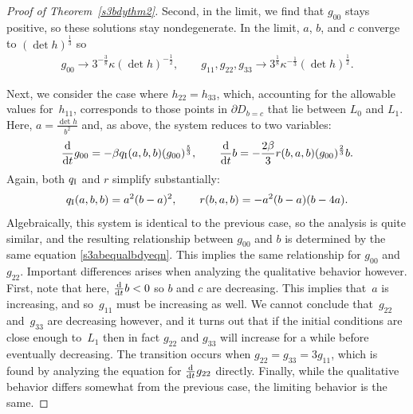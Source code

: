 \documentclass[pdftex]{sigma}
\numberwithin{equation}{section}
\newcommand{\dtime}{\frac{{\rm d}}{{\rm d} t}} %
\begin{document}
\begin{proof}[Proof of Theorem~\ref{s3bdythm2}]
Second, in the limit, we find that $g_{00}$ stays positive, so these solutions stay nondegenerate. In the limit, $a$, $b$, and $c$ converge to $(\det h)^{\frac{1}{3}}$ so
\begin{gather*}
g_{00} \rightarrow 3^{-\frac{3}{8}} \kappa (\det h)^{-\frac{1}{2}},\qquad
g_{11}, g_{22}, g_{33} \rightarrow 3^{\frac{1}{8}} \kappa^{-\frac{1}{3}} (\det h)^{\frac{1}{2}}.
\end{gather*}

Next, we consider the case where $h_{22} = h_{33}$, which, accounting for the allowable values for~$h_{11}$, corresponds to those points in $\partial D_{b = c}$ that lie between $L_0$ and $L_1$. Here, $a = \frac{\det h}{b^2}$ and, as above, the system reduces to two variables:
\begin{gather*}
\dtime g_{00} = - \beta q_{\rm I}(a, b, b) (g_{00})^{\frac{5}{3}},\qquad
\dtime b = - \frac{2 \beta}{3} r(b, a, b) (g_{00})^{\frac{2}{3}} b.
\end{gather*}
Again, both $q_{\rm I}$ and $r$ simplify substantially:
\begin{gather*}
q_{\rm I}(a, b, b) = a^2 (b - a)^2,\qquad
r(b, a, b) = -a^2 (b - a) (b - 4a).
\end{gather*}
Algebraically, this system is identical to the previous case, so the analysis is quite similar, and the resulting relationship between $g_{00}$ and $b$ is determined by the same equation \eqref{s3abequalbdyeqn}. This implies the same relationship for $g_{00}$ and $g_{22}$. Important differences arises when analyzing the qualitative behavior however. First, note that here, $\dtime b < 0$ so $b$ and $c$ are decreasing. This implies that~$a$ is increasing, and so~$g_{11}$ must be increasing as well. We cannot conclude that~$g_{22}$ and~$g_{33}$ are decreasing however, and it turns out that if the initial conditions are close enough to~$L_1$ then in fact $g_{22}$ and $g_{33}$ will increase for a while before eventually decreasing. The transition occurs when $g_{22} = g_{33} = 3g_{11}$, which is found by analyzing the equation for $\dtime g_{22}$ directly. Finally, while the qualitative behavior differs somewhat from the previous case, the limiting behavior is the same.
\end{proof}
\end{document}
